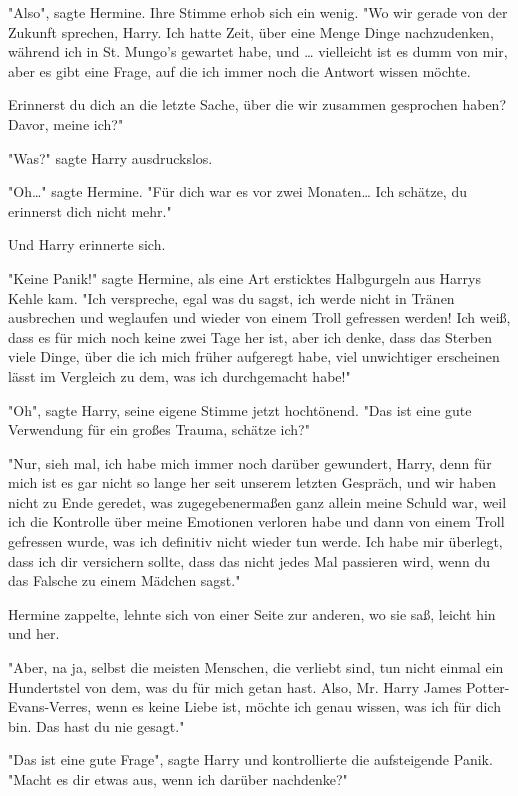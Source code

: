 {"Also", sagte Hermine. Ihre Stimme erhob sich ein wenig. "Wo wir gerade von der Zukunft sprechen, Harry. Ich hatte Zeit, über eine Menge Dinge nachzudenken, während ich in St. Mungo's gewartet habe, und … vielleicht ist es dumm von mir, aber es gibt eine Frage, auf die ich immer noch die Antwort wissen möchte.

Erinnerst du dich an die letzte Sache, über die wir zusammen gesprochen haben? Davor, meine ich?"

"Was?" sagte Harry ausdruckslos.

"Oh…" sagte Hermine. "Für dich war es vor zwei Monaten… Ich schätze, du erinnerst dich nicht mehr."

Und Harry erinnerte sich.

"Keine Panik!" sagte Hermine, als eine Art ersticktes Halbgurgeln aus Harrys Kehle kam. "Ich verspreche, egal was du sagst, ich werde nicht in Tränen ausbrechen und weglaufen und wieder von einem Troll gefressen werden! Ich weiß, dass es für mich noch keine zwei Tage her ist, aber ich denke, dass das Sterben viele Dinge, über die ich mich früher aufgeregt habe, viel unwichtiger erscheinen lässt im Vergleich zu dem, was ich durchgemacht habe!"

"Oh", sagte Harry, seine eigene Stimme jetzt hochtönend. "Das ist eine gute Verwendung für ein großes Trauma, schätze ich?"

"Nur, sieh mal, ich habe mich immer noch darüber gewundert, Harry, denn für mich ist es gar nicht so lange her seit unserem letzten Gespräch, und wir haben nicht zu Ende geredet, was zugegebenermaßen ganz allein meine Schuld war, weil ich die Kontrolle über meine Emotionen verloren habe und dann von einem Troll gefressen wurde, was ich definitiv nicht wieder tun werde. Ich habe mir überlegt, dass ich dir versichern sollte, dass das nicht jedes Mal passieren wird, wenn du das Falsche zu einem Mädchen sagst."

Hermine zappelte, lehnte sich von einer Seite zur anderen, wo sie saß, leicht hin und her.

"Aber, na ja, selbst die meisten Menschen, die verliebt sind, tun nicht einmal ein Hundertstel von dem, was du für mich getan hast. Also, Mr. Harry James Potter-Evans-Verres, wenn es keine Liebe ist, möchte ich genau wissen, was ich für dich bin. Das hast du nie gesagt."

"Das ist eine gute Frage", sagte Harry und kontrollierte die aufsteigende Panik. "Macht es dir etwas aus, wenn ich darüber nachdenke?"

}
